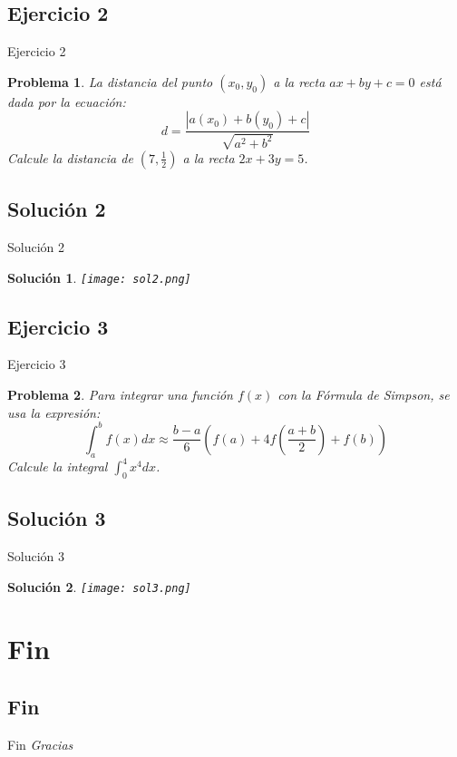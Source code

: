 \documentclass[12pt]{beamer}
\newtheorem{prob}{Problema}
\newtheorem{sol}{Solución}
\begin{document}
\subsection{Ejercicio 2}
\begin{frame}{Ejercicio 2}
\begin{prob}
	La distancia del punto $(x_0, y_0)$ a la recta $ax + by + c = 0$ está dada por la ecuación:
	\[d = \frac{|a(x_0) + b(y_0) + c|}{\sqrt{a^2 + b^2}}\]
	Calcule la distancia de $(7, \frac{1}{2})$ a la recta $2x + 3y = 5$. 
\end{prob}
\end{frame}
\subsection{Solución 2}
\begin{frame}{Solución 2}
\begin{sol}
	 \texttt{[image: sol2.png]}
\end{sol}
\end{frame}

\subsection{Ejercicio 3}
\begin{frame}{Ejercicio 3}
	\begin{prob}
		Para integrar una función $f(x)$ con la Fórmula de Simpson, se usa la expresión:
		\[
		\int_{a}^{b} {f(x) dx} \approx \frac{b - a}{6}\left(f(a) + 4f\left(\frac{a + b}{2}\right) + f(b)\right)
		\]
		Calcule la integral $\int_{0}^{4}{x^4 dx}$.
	\end{prob}
\end{frame}

\subsection{Solución 3}
\begin{frame}{Solución 3}
\begin{sol}
	 \texttt{[image: sol3.png]}	
\end{sol}
\end{frame}
\section{Fin}
\subsection{Fin}
\begin{frame}{Fin}
	\centering \Huge
	\emph{Gracias}
\end{frame}
\end{document}
